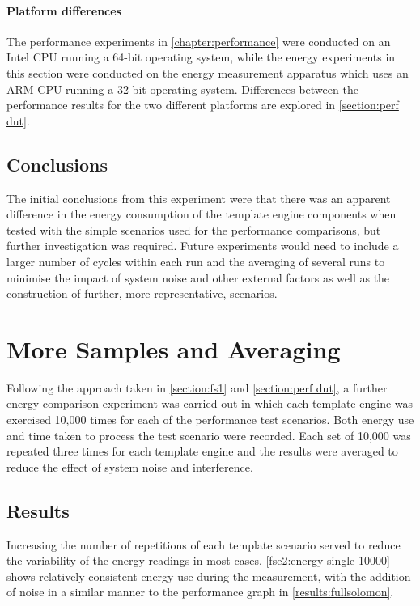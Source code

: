 \paragraph{Platform differences}
The performance experiments in \autoref{chapter:performance} were conducted on an Intel CPU running a 64-bit operating system, while the energy experiments in this section were conducted on the energy measurement apparatus which uses an ARM CPU running a 32-bit operating system. Differences between the performance results for the two different platforms are explored in \autoref{section:perf dut}.

\subsection{Conclusions}
\label{fse conclusions}

The initial conclusions from this experiment were that there was an apparent difference in the energy consumption of the template engine components when tested with the simple scenarios used for the performance comparisons, but further investigation was required. Future experiments would need to include a larger number of cycles within each run and the averaging of several runs to minimise the impact of system noise and other external factors as well as the construction of further, more representative, scenarios.


\section{More Samples and Averaging}
\label{section:fse2}

Following the approach taken in \autoref{section:fs1} and \autoref{section:perf dut}, a further energy comparison experiment was carried out in which each template engine was exercised 10,000 times for each of the performance test scenarios. Both energy use and time taken to process the test scenario were recorded. Each set of 10,000 was repeated three times for each template engine and the results were averaged to reduce the effect of system noise and interference.

\subsection{Results}
\label{fse2 results}

Increasing the number of repetitions of each template scenario served to reduce the variability of the energy readings in most cases. \autoref{fse2:energy single 10000} shows relatively consistent energy use during the measurement, with the addition of noise in a similar manner to the performance graph in \autoref{results:fullsolomon}.

